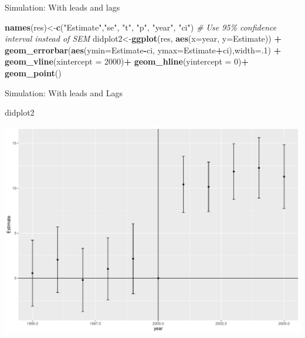 \documentclass[
  ignorenonframetext,
]{beamer}
\newenvironment{Shaded}{\begin{snugshade}}{\end{snugshade}}
\newcommand{\AttributeTok}[1]{\textcolor[rgb]{0.13,0.29,0.53}{#1}}
\newcommand{\CommentTok}[1]{\textcolor[rgb]{0.56,0.35,0.01}{\textit{#1}}}
\newcommand{\DecValTok}[1]{\textcolor[rgb]{0.00,0.00,0.81}{#1}}
\newcommand{\FunctionTok}[1]{\textcolor[rgb]{0.13,0.29,0.53}{\textbf{#1}}}
\newcommand{\NormalTok}[1]{#1}
\newcommand{\OtherTok}[1]{\textcolor[rgb]{0.56,0.35,0.01}{#1}}
\newcommand{\SpecialCharTok}[1]{\textcolor[rgb]{0.81,0.36,0.00}{\textbf{#1}}}
\newcommand{\StringTok}[1]{\textcolor[rgb]{0.31,0.60,0.02}{#1}}
\begin{document}
\begin{frame}[fragile]{Simulation: With leads and lags}
\begin{Shaded}
\begin{Highlighting}[]
\FunctionTok{names}\NormalTok{(res)}\OtherTok{\textless{}{-}}\FunctionTok{c}\NormalTok{(}\StringTok{"Estimate"}\NormalTok{,}\StringTok{"se"}\NormalTok{, }\StringTok{"t"}\NormalTok{,  }\StringTok{"p"}\NormalTok{, }\StringTok{"year"}\NormalTok{, }\StringTok{"ci"}\NormalTok{)}
\CommentTok{\# Use 95\% confidence interval instead of SEM}
\NormalTok{didplot2}\OtherTok{\textless{}{-}}\FunctionTok{ggplot}\NormalTok{(res, }\FunctionTok{aes}\NormalTok{(}\AttributeTok{x=}\NormalTok{year, }\AttributeTok{y=}\NormalTok{Estimate)) }\SpecialCharTok{+} 
    \FunctionTok{geom\_errorbar}\NormalTok{(}\FunctionTok{aes}\NormalTok{(}\AttributeTok{ymin=}\NormalTok{Estimate}\SpecialCharTok{{-}}\NormalTok{ci, }\AttributeTok{ymax=}\NormalTok{Estimate}\SpecialCharTok{+}\NormalTok{ci),}\AttributeTok{width=}\NormalTok{.}\DecValTok{1}\NormalTok{) }\SpecialCharTok{+}
    \FunctionTok{geom\_vline}\NormalTok{(}\AttributeTok{xintercept =} \DecValTok{2000}\NormalTok{)}\SpecialCharTok{+}
      \FunctionTok{geom\_hline}\NormalTok{(}\AttributeTok{yintercept =} \DecValTok{0}\NormalTok{)}\SpecialCharTok{+}
     \FunctionTok{geom\_point}\NormalTok{()}
\end{Highlighting}
\end{Shaded}
\end{frame}

\begin{frame}[fragile]{Simulation: With leads and Lags}
\protect\hypertarget{simulation-with-leads-and-lags-7}{}
\begin{Shaded}
\begin{Highlighting}[]
\NormalTok{didplot2}
\end{Highlighting}
\end{Shaded}

\includegraphics{Slides8_DID_files/figure-beamer/didplot_fig2-1.pdf}
\end{frame}
\end{document}
